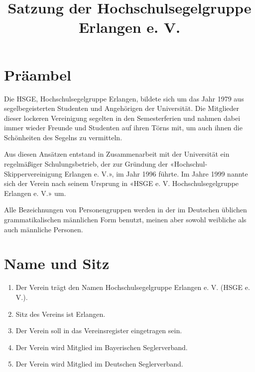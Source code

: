 \documentclass[10pt, twocolumn, parskip=half]{scrartcl}
\title{\large Satzung der Hochschulsegelgruppe Erlangen e. V.}
\date{\vspace{-5ex}}
\begin{document}
	
{}

\section*{Präambel}
 Die HSGE, Hochschulsegelgruppe Erlangen, bildete sich um
das Jahr 1979 aus segelbegeisterten Studenten und Angehörigen der Universität. Die
Mitglieder dieser lockeren Vereinigung segelten in den Semesterferien und nahmen dabei immer wieder Freunde und Studenten auf ihren Törns mit, um auch ihnen die Schönheiten des Segelns zu vermitteln.

Aus diesen Ansätzen entstand in Zusammenarbeit mit der Universität ein regelmäßiger
Schulungsbetrieb, der zur Gründung der «Hochschul-Skippervereinigung Erlangen e. V.», im
Jahr 1996 führte. Im Jahre 1999 nannte sich der Verein nach seinem Ursprung in «HSGE e. V. Hochschulsegelgruppe Erlangen e. V.» um.

Alle Bezeichnungen von Personengruppen werden in der im Deutschen üblichen
grammatikalischen männlichen Form benutzt, meinen aber sowohl weibliche als auch
männliche Personen.


\section{Name und Sitz}
\begin{enumerate}[noitemsep]
	\setlength\itemsep{0em}
	\item Der Verein trägt den Namen Hochschulsegelgruppe Erlangen e. V. (HSGE e. V.).
	\item Sitz des Vereins ist Erlangen.
	\item Der Verein soll in das Vereinsregister eingetragen sein.
	\item Der Verein wird Mitglied im Bayerischen Seglerverband.
	\item Der Verein wird Mitglied im Deutschen Seglerverband.
\end{enumerate}
\end{document}
